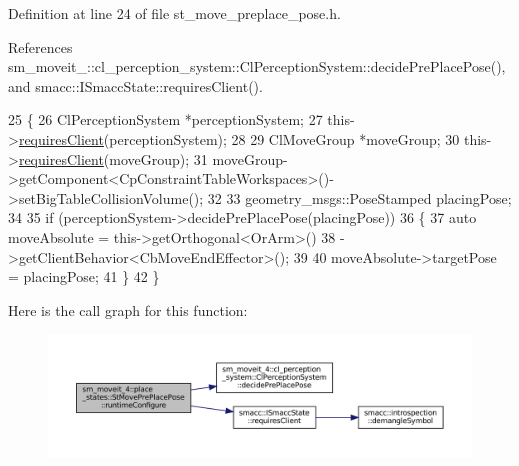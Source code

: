 Definition at line 24 of file st\+\_\+move\+\_\+preplace\+\_\+pose.\+h.



References sm\+\_\+moveit\+\_\+::cl\+\_\+perception\+\_\+system\+::\+Cl\+Perception\+System\+::decide\+Pre\+Place\+Pose(), and smacc\+::\+I\+Smacc\+State\+::requires\+Client().


\begin{DoxyCode}
25             \{
26                 ClPerceptionSystem *perceptionSystem;
27                 this->\hyperlink{classsmacc_1_1ISmaccState_a7f95c9f0a6ea2d6f18d1aec0519de4ac}{requiresClient}(perceptionSystem);
28 
29                 ClMoveGroup *moveGroup;
30                 this->\hyperlink{classsmacc_1_1ISmaccState_a7f95c9f0a6ea2d6f18d1aec0519de4ac}{requiresClient}(moveGroup);
31                 moveGroup->getComponent<CpConstraintTableWorkspaces>()->setBigTableCollisionVolume();
32 
33                 geometry\_msgs::PoseStamped placingPose;
34 
35                 \textcolor{keywordflow}{if} (perceptionSystem->decidePrePlacePose(placingPose))
36                 \{
37                     \textcolor{keyword}{auto} moveAbsolute = this->getOrthogonal<OrArm>()
38                                             ->getClientBehavior<CbMoveEndEffector>();
39 
40                     moveAbsolute->targetPose = placingPose;
41                 \}
42             \}
\end{DoxyCode}
Here is the call graph for this function\+:
\nopagebreak
\begin{figure}[H]
\begin{center}
\leavevmode
\includegraphics[width=350pt]{structsm__moveit__4_1_1place__states_1_1StMovePrePlacePose_a76aecb88d891dab05216eff868ee4ac7_cgraph}
\end{center}
\end{figure}
\mbox{\label{structsm__moveit__4_1_1place__states_1_1StMovePrePlacePose_afea638295fb6086b4d31c6b64302f2c2}} 
